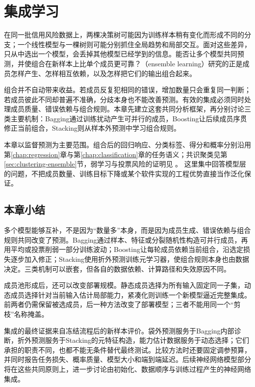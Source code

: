 \chapter{集成学习}
\label{chap:ensemble-learning}

在同一批信用风险数据上，两棵决策树可能因为训练样本稍有变化而形成不同的分支；一个线性模型与一棵树则可能分别抓住全局趋势和局部交互。面对这些差异，只从中选出一个模型，会丢掉其他模型已经学到的信息。能否让多个模型共同预测，并使组合在新样本上比单个成员更可靠？（ensemble learning）研究的正是成员怎样产生、怎样相互依赖，以及怎样把它们的输出组合起来。

组合并不自动带来收益。若成员反复犯相同的错误，增加数量只会重复同一判断；若成员彼此不同却普遍不准确，分歧本身也不能改善预测。有效的集成必须同时处理成员质量、错误依赖与组合规则。本章先建立这套共同分析框架，再分别讨论三类主要机制：Bagging通过训练扰动产生可并行的成员，Boosting让后续成员序贯修正当前组合，Stacking则从样本外预测中学习组合规则。

本章以监督预测为主要范围。组合后的回归响应、分类标签、得分和概率分别沿用第\ref{chap:regression}章与第\ref{chap:classification}章的任务语义；共识聚类见第\ref{sec:clustering-ensemble}节，弱学习与投票风险的证明见
。
这里集中回答模型层的问题，不把成员数量、训练目标下降或某个软件实现的工程优势直接当作泛化保证。








\section{本章小结}
\label{sec:ensemble-summary}

多个模型能够互补，不是因为“数量多”本身，而是因为成员生成、错误依赖与组合规则共同改变了预测。Bagging通过样本、特征或分裂随机性构造可并行成员，再用平均或投票削弱一部分训练波动；Boosting让每轮成员依赖当前组合，沿选定损失逐步加入修正；Stacking使用折外预测训练元学习器，使组合规则本身也由数据决定。三类机制可以嵌套，但各自的数据依赖、计算路径和失效原因不同。

成员池形成后，还可以改变部署规模。静态成员选择为所有输入固定同一子集，动态成员选择针对当前输入估计局部能力，紧凑化则训练一个新模型逼近完整集成。前两者仍需保留被选成员，后一种方法改变了部署模型；三者不能用同一个“剪枝”名称掩盖。

集成的最终证据来自冻结流程后的新样本评价。袋外预测服务于Bagging内部诊断，折外预测服务于Stacking的元特征构造，能力估计数据服务于动态选择；它们承担的职责不同，也都不能无条件替代最终测试。比较方法时还要固定调参预算，并同时报告任务损失、概率质量、模型大小和端到端延迟。后续神经网络模型部分将在这些共同原则上，进一步讨论由初始化、数据顺序与训练过程产生的神经网络集成。
